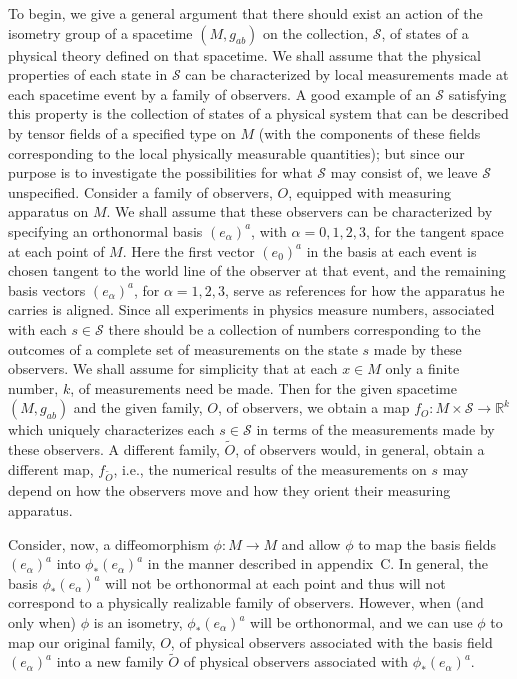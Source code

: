 To begin, we give a general argument that there should exist an action of the
isometry group of a spacetime \((M,g_{ab})\) on the collection, \(\mathcal S\), of
states of a physical theory defined on that spacetime. We shall assume that the
physical properties of each state in \(\mathcal S\) can be characterized by local
measurements made at each spacetime event by a family of observers. A good example
of an \(\mathcal S\) satisfying this property is the collection of states of a physical
system that can be described by tensor fields of a specified type on \(M\) (with the
components of these fields corresponding to the local physically measurable
quantities); but since our purpose is to investigate the possibilities for what
\(\mathcal S\) may consist of, we leave \(\mathcal S\) unspecified. Consider a family
of observers, \(O\), equipped with measuring apparatus on \(M\). We shall assume
that these observers can be characterized by specifying an orthonormal basis
\((e_\alpha)^a\), with \(\alpha=0,1,2,3\), for the tangent space at each point of
\(M\). Here the first vector \((e_0)^a\) in the basis at each event is chosen tangent
to the world line of the observer at that event, and the remaining basis vectors
\((e_\alpha)^a\), for \(\alpha=1,2,3\), serve as references for how the apparatus he
carries is aligned. Since all experiments in physics measure numbers, associated
with each \(s\in\mathcal S\) there should be a collection of numbers corresponding to
the outcomes of a complete set of measurements on the state \(s\) made by these
observers. We shall assume for simplicity that at each \(x\in M\) only a finite
number, \(k\), of measurements need be made. Then for the given spacetime
\((M,g_{ab})\) and the given family, \(O\), of observers, we obtain a map
\(f_O:M\times\mathcal S\longrightarrow\mathbb R^k\) which uniquely characterizes
each \(s\in\mathcal S\) in terms of the measurements made by these observers. A
different family, \(\widetilde O\), of observers would, in general, obtain a different
map, \(f_{\widetilde O}\), i.e., the numerical results of the measurements on \(s\)
may depend on how the observers move and how they orient their measuring apparatus.

Consider, now, a diffeomorphism \(\phi:M\longrightarrow M\) and allow \(\phi\) to
map the basis fields \((e_\alpha)^a\) into \(\phi_*(e_\alpha)^a\) in the manner
described in appendix~C. In general, the basis \(\phi_*(e_\alpha)^a\) will not be
orthonormal at each point and thus will not correspond to a physically realizable
family of observers. However, when (and only when) \(\phi\) is an isometry,
\(\phi_*(e_\alpha)^a\) will be orthonormal, and we can use \(\phi\) to map our
original family, \(O\), of physical observers associated with the basis field
\((e_\alpha)^a\) into a new family \(\widetilde O\) of physical observers associated
with \(\phi_*(e_\alpha)^a\).

